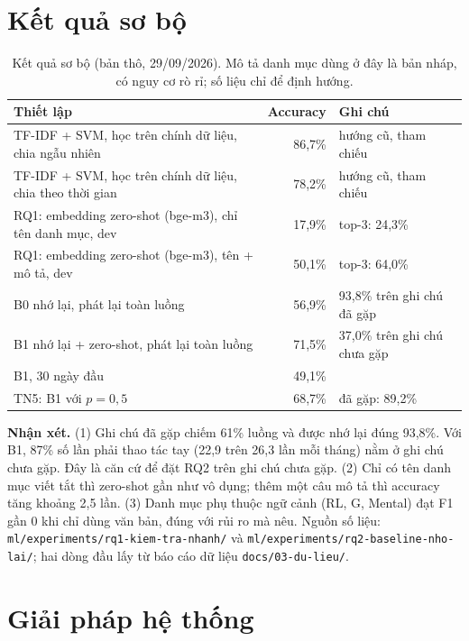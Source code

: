 \documentclass[12pt,a4paper]{article}
\begin{document}
\section{Kết quả sơ bộ}

\begin{table}[H]
\centering\small
\caption{Kết quả sơ bộ (bản thô, 29/09/2026). Mô tả danh mục dùng ở đây là bản nháp, có nguy cơ rò rỉ; số liệu chỉ để định hướng.}
\label{tab:prelim}
\begin{tabularx}{\linewidth}{L r l}
\toprule
Thiết lập & Accuracy & Ghi chú \\
\midrule
TF-IDF + SVM, học trên chính dữ liệu, chia ngẫu nhiên & 86,7\% & hướng cũ, tham chiếu \\
TF-IDF + SVM, học trên chính dữ liệu, chia theo thời gian & 78,2\% & hướng cũ, tham chiếu \\
\midrule
RQ1: embedding zero-shot (bge-m3), chỉ tên danh mục, dev & 17,9\% & top-3: 24,3\% \\
RQ1: embedding zero-shot (bge-m3), tên + mô tả, dev & 50,1\% & top-3: 64,0\% \\
\midrule
B0 nhớ lại, phát lại toàn luồng & 56,9\% & 93,8\% trên ghi chú đã gặp \\
B1 nhớ lại + zero-shot, phát lại toàn luồng & 71,5\% & 37,0\% trên ghi chú chưa gặp \\
B1, 30 ngày đầu & 49,1\% & \\
TN5: B1 với $p=0{,}5$ & 68,7\% & đã gặp: 89,2\% \\
\bottomrule
\end{tabularx}
\end{table}

\textbf{Nhận xét.} (1) Ghi chú đã gặp chiếm 61\% luồng và được nhớ lại đúng 93,8\%. Với B1, 87\% số lần phải thao tác tay (22,9 trên 26,3 lần mỗi tháng) nằm ở ghi chú chưa gặp. Đây là căn cứ để đặt RQ2 trên ghi chú chưa gặp. (2) Chỉ có tên danh mục viết tắt thì zero-shot gần như vô dụng; thêm một câu mô tả thì accuracy tăng khoảng 2,5 lần. (3) Danh mục phụ thuộc ngữ cảnh (RL, G, Mental) đạt F1 gần 0 khi chỉ dùng văn bản, đúng với rủi ro mà \citet{li2023synthetic} nêu. Nguồn số liệu: \texttt{ml/experiments/rq1-kiem-tra-nhanh/} và \texttt{ml/experiments/rq2-baseline-nho-lai/}; hai dòng đầu lấy từ báo cáo dữ liệu \texttt{docs/03-du-lieu/}.

\section{Giải pháp hệ thống}
\end{document}
